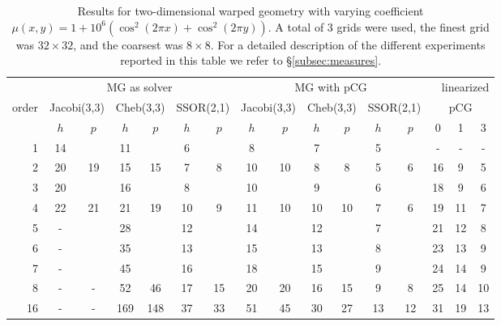 \documentclass[smallcondensed,final]{svjour3}     %
\begin{document}
\begin{table}
  \caption{\label{tab:2d-fan} Results for two-dimensional warped
    geometry with varying coefficient $\mu(x,y) = 1 + 10^6(\cos^2(2\pi
    x) + \cos^2(2\pi y))$.  A total of 3 grids were used, the finest
    grid was $32\times 32$, and the coarsest was $8\times 8$. For a
    detailed description of the different experiments reported in this
    table we refer to \S\ref{subsec:measures}.}  \centering
  \begin{tabular}{|r|c c|c c|c c||c c|c c|c c||c c c|} 
    \hline
    & \multicolumn{6}{c||}{MG as solver} & \multicolumn{6}{c||}{MG with pCG} & \multicolumn{3}{r|}{linearized} \\
    \cline{2-13}
    \!\!\! order \!\!\!\! &  \multicolumn{2}{c|}{\!\!\scriptsize  Jacobi(3,3)\!\!} &  \multicolumn{2}{c|}{\!\!\scriptsize Cheb(3,3)\!\!} & \multicolumn{2}{c||}{\!\!\scriptsize  SSOR(2,1)\!\!} & \multicolumn{2}{c|}{\!\!\scriptsize Jacobi(3,3)\!\!} &  \multicolumn{2}{c|}{\!\!\scriptsize Cheb(3,3)\!\!} & \multicolumn{2}{c||}{\!\!\scriptsize SSOR(2,1)\!\!} & \multicolumn{3}{c|}{pCG}\\
\hline
 & $h$ & $p$ & $h$ & $p$& $h$ & $p$& $h$ & $p$& $h$ & $p$& $h$ & $p$& 0 & 1 & 3\\
 \cline{2-16}
1 & 14 & & 11 & & 6 & & 8 & & 7 & & 5 & & - & - & - \\
2 & 20 & 19 & 15 & 15 & 7 & 8 & 10 & 10 & 8 & 8 & 5 & 6 & 16 & 9 & 5 \\
3 & 20 & & 16 & & 8 & & 10 & & 9 & & 6 & & 18 & 9 & 6 \\
4 & 22 & 21 & 21 & 19 & 10 & 9 & 11 & 10 & 10 & 10 & 7 & 6 & 19 & 11 & 7\\
5 & -  & & 28 & & 12 & & 14 & & 12 & & 7 & & 21 & 12 & 8  \\
6 & -  & & 35 & & 13 & & 15 & & 13 & & 8 & & 23 & 13 & 9 \\
7 & -  & & 45 & & 16 & & 18 & & 15 & & 9 & & 24 & 14 & 9 \\
8 & -  & - & 52 & 46 & 17 & 15 & 20 & 20 & 16 & 15 & 9 & 8 & 25 & 14 & 10 \\
16 & - & - & 169 & 148 & 37 & 33 & 51 & 45 & 30 & 27 & 13 & 12 & 31 & 19 & 13 \\
\hline
  \end{tabular}
\end{table}
\end{document}

